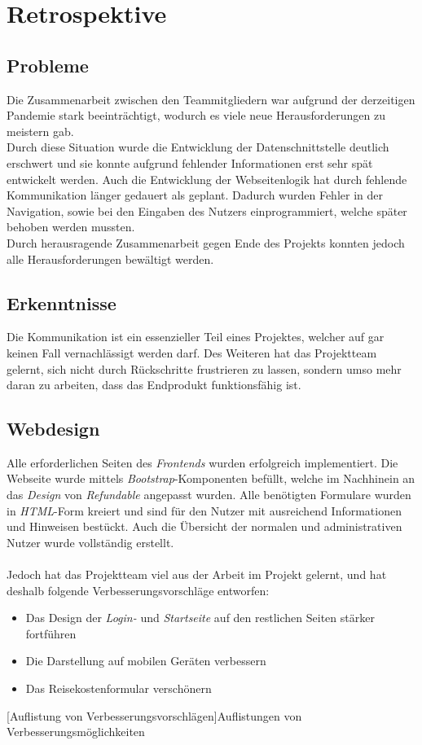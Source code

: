 \chapter{Retrospektive}
\section{Probleme}
Die Zusammenarbeit zwischen den Teammitgliedern war aufgrund der derzeitigen Pandemie stark beeinträchtigt, wodurch es viele neue Herausforderungen zu meistern gab.\\

Durch diese Situation wurde die Entwicklung der Datenschnittstelle deutlich erschwert und sie konnte aufgrund fehlender Informationen erst sehr spät entwickelt werden. Auch die Entwicklung der Webseitenlogik hat durch fehlende Kommunikation länger gedauert als geplant. Dadurch wurden Fehler in der Navigation, sowie bei den Eingaben des Nutzers einprogrammiert, welche später behoben werden mussten.\\

Durch herausragende Zusammenarbeit gegen Ende des Projekts konnten jedoch alle Herausforderungen bewältigt werden.
\section{Erkenntnisse}
Die Kommunikation ist ein essenzieller Teil eines Projektes, welcher auf gar keinen Fall vernachlässigt werden darf. Des Weiteren hat das Projektteam gelernt, sich nicht durch Rückschritte frustrieren zu lassen, sondern umso mehr daran zu arbeiten, dass das Endprodukt funktionsfähig ist.
\newpage
\section{Webdesign}
Alle erforderlichen Seiten des \textit{Frontends} wurden erfolgreich implementiert. Die Webseite wurde mittels \textit{Bootstrap}-Komponenten befüllt, welche im Nachhinein an das \textit{Design} von \textit{Refundable} angepasst wurden. Alle benötigten Formulare wurden in \textit{HTML}-Form kreiert und sind für den Nutzer mit ausreichend Informationen und Hinweisen bestückt. Auch die Übersicht der normalen und administrativen Nutzer wurde vollständig erstellt.\\
~\\
Jedoch hat das Projektteam viel aus der Arbeit im Projekt gelernt, und hat deshalb folgende Verbesserungsvorschläge entworfen:
\begin{itemize}
	\item Das Design der \textit{Login-} und \textit{Startseite} auf den restlichen Seiten stärker fortführen
	\item Die Darstellung auf mobilen Geräten verbessern
	\item Das Reisekostenformular verschönern
\end{itemize}
[Auflistung von Verbesserungsvorschlägen]{Auflistungen von Verbesserungsmöglichkeiten}

